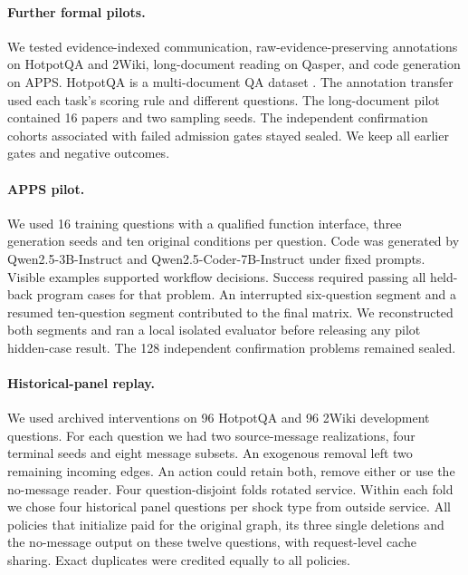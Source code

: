 \documentclass[11pt]{article}
\begin{document}
\paragraph{Further formal pilots.} We tested evidence-indexed communication, raw-evidence-preserving annotations on HotpotQA and 2Wiki, long-document reading on Qasper, and code generation on APPS. HotpotQA is a multi-document QA dataset \citep{hotpot}. The annotation transfer used each task's scoring rule and different questions. The long-document pilot contained 16 papers and two sampling seeds. The independent confirmation cohorts associated with failed admission gates stayed sealed. We keep all earlier gates and negative outcomes.

\paragraph{APPS pilot.} We used 16 training questions with a qualified function interface, three generation seeds and ten original conditions per question. Code was generated by Qwen2.5-3B-Instruct and Qwen2.5-Coder-7B-Instruct under fixed prompts. Visible examples supported workflow decisions. Success required passing all held-back program cases for that problem. An interrupted six-question segment and a resumed ten-question segment contributed to the final matrix. We reconstructed both segments and ran a local isolated evaluator before releasing any pilot hidden-case result. The 128 independent confirmation problems remained sealed.

\paragraph{Historical-panel replay.} We used archived interventions on 96 HotpotQA and 96 2Wiki development questions. For each question we had two source-message realizations, four terminal seeds and eight message subsets. An exogenous removal left two remaining incoming edges. An action could retain both, remove either or use the no-message reader. Four question-disjoint folds rotated service. Within each fold we chose four historical panel questions per shock type from outside service. All policies that initialize paid for the original graph, its three single deletions and the no-message output on these twelve questions, with request-level cache sharing. Exact duplicates were credited equally to all policies.
\end{document}

